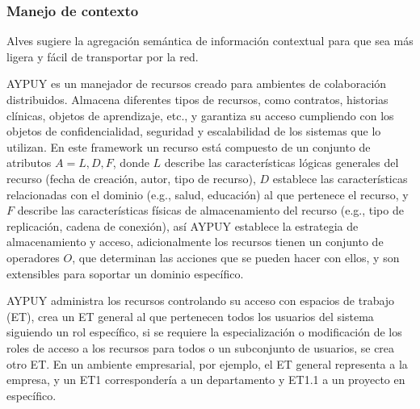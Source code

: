 \subsubsection {Manejo de contexto}
Alves \cite{alves2013radiator} sugiere la agregaci\'on sem\'antica de informaci\'on contextual para que sea m\'as ligera y f\'acil de transportar por la red.

AYPUY es un manejador de recursos creado para ambientes de colaboraci\'on distribuidos.  Almacena diferentes tipos de recursos, como contratos, historias cl\'inicas, objetos de aprendizaje, etc., y garantiza su acceso cumpliendo con los objetos de confidencialidad, seguridad y escalabilidad de los sistemas que lo utilizan. En este framework un recurso est\'a compuesto de un conjunto de atributos $A = { L, D, F }$, donde $L$ describe las caracter\'isticas l\'ogicas generales del recurso (fecha de creaci\'on, autor, tipo de recurso), $D$ establece las caracter\'isticas relacionadas con el dominio (e.g., salud, educaci\'on) al que pertenece el recurso, y $F$ describe las caracter\'isticas f\'isicas de almacenamiento del recurso (e.g., tipo de replicaci\'on, cadena de conexi\'on), as\'i AYPUY establece la estrategia de almacenamiento y acceso, adicionalmente los recursos tienen un conjunto de operadores $O$, que determinan las acciones que se pueden hacer con ellos, y son extensibles para soportar un dominio espec\'ifico.

AYPUY administra los recursos controlando su acceso con espacios de trabajo (ET), crea un ET general al que pertenecen todos los usuarios del sistema siguiendo un rol espec\'ifico, si se requiere la especializaci\'on o modificaci\'on de los roles de acceso a los recursos para todos o un subconjunto de usuarios, se crea otro ET. En un ambiente empresarial, por ejemplo, el ET general representa a la empresa, y un ET1 corresponder\'ia a un departamento y ET1.1 a un proyecto en espec\'ifico.

